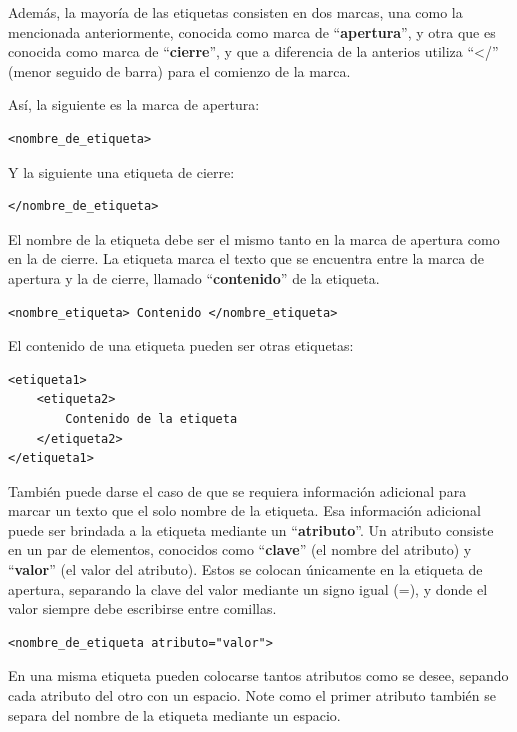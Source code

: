 Además, la mayoría de las etiquetas consisten en dos marcas, una como la
mencionada anteriormente, conocida como marca de ``\textbf{apertura}'', y otra
que es conocida como marca de ``\textbf{cierre}'', y que a diferencia de la
anterios utiliza ``</'' (menor seguido de barra) para el comienzo de la marca.

Así, la siguiente es la marca  de apertura:
\begin{lstlisting}[language=XHTML]
<nombre_de_etiqueta>
\end{lstlisting}

Y la siguiente una etiqueta de cierre:
\begin{lstlisting}[language=XHTML]
</nombre_de_etiqueta>
\end{lstlisting}

El nombre de la etiqueta debe ser el mismo tanto en la marca de apertura
como en la de cierre. La etiqueta marca el texto que se encuentra entre
la marca de apertura y la de cierre, llamado ``\textbf{contenido}'' de la etiqueta.

\begin{lstlisting}[language=XHTML]
<nombre_etiqueta> Contenido </nombre_etiqueta>
\end{lstlisting}

El contenido de una etiqueta pueden ser otras etiquetas:
\begin{lstlisting}[language=XHTML]
<etiqueta1>
    <etiqueta2>
        Contenido de la etiqueta
    </etiqueta2>
</etiqueta1>
\end{lstlisting}

También puede darse el caso de que se requiera información adicional para marcar
un texto que el solo nombre de la etiqueta. Esa información adicional puede
ser brindada a la etiqueta mediante un ``\textbf{atributo}''. Un atributo consiste en un
par de elementos, conocidos como ``\textbf{clave}'' (el nombre del atributo)
y ``\textbf{valor}'' (el valor del atributo). Estos se colocan únicamente en la
etiqueta de apertura, separando la clave del valor mediante un signo igual (=),
y donde el valor siempre debe escribirse entre comillas.

\begin{lstlisting}[language=XHTML]
<nombre_de_etiqueta atributo="valor">
\end{lstlisting}

En una misma etiqueta pueden colocarse tantos atributos como se desee, sepando
cada atributo del otro con un espacio. Note como el primer atributo también
se separa del nombre de la etiqueta mediante un espacio.

